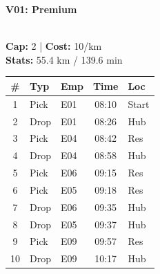 \documentclass[a4paper,11pt]{article}
\begin{document}
\noindent
\begin{minipage}[t]{0.24\textwidth}
    \centering
    \colorbox{velorablue}{\parbox{\dimexpr\linewidth-2\fboxsep}{\centering \color{white}\textbf{V01: Premium}}} \\
    \vspace{0.05cm}
    {\tiny \textbf{Cap:} 2 | \textbf{Cost:} 10/km \\ \textbf{Stats:} 55.4 km / 139.6 min}
    \vspace{0.05cm}
    
    \renewcommand{\arraystretch}{0.9}
    \setlength{\tabcolsep}{1pt}
    \tiny
    \begin{tabular}{c l l c l}
        \toprule
        \textbf{\#} & \textbf{Typ} & \textbf{Emp} & \textbf{Time} & \textbf{Loc} \\
        \midrule
        1 & Pick & E01 & 08:10 & Start \\
        \rowcolor{headergray} 2 & Drop & E01 & 08:26 & Hub \\
        3 & Pick & E04 & 08:42 & Res \\
        \rowcolor{headergray} 4 & Drop & E04 & 08:58 & Hub \\
        5 & Pick & E06 & 09:15 & Res \\
        \rowcolor{headergray} 6 & Pick & E05 & 09:18 & Res \\
        7 & Drop & E06 & 09:35 & Hub \\
        \rowcolor{headergray} 8 & Drop & E05 & 09:37 & Hub \\
        9 & Pick & E09 & 09:57 & Res \\
        \rowcolor{headergray} 10 & Drop & E09 & 10:17 & Hub \\
        \bottomrule
    \end{tabular}
\end{minipage}
\hfill
\end{document}

